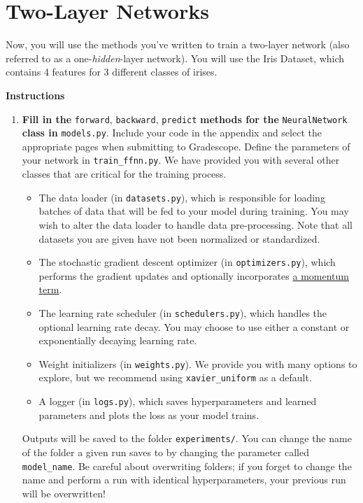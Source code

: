 \documentclass{article}
\newcommand{\Question}[1]{\Large \section{ #1 } \normalsize}
\begin{document}
\newpage
\Question{Two-Layer Networks}
Now, you will use the methods you've written to train a two-layer network (also referred to as a one-\emph{hidden}-layer network). 
You will use the Iris Dataset, which contains 4 features for 3 different classes of irises.

\textbf{Instructions}
\begin{enumerate}
    \item 
    \textbf{Fill in the} \texttt{forward}, \texttt{backward}, \texttt{predict} \textbf{methods for the} \texttt{NeuralNetwork} \textbf{class in} \texttt{models.py}. 
    Include your code in the appendix and select the appropriate pages when submitting to Gradescope. 
    Define the parameters of your network in \texttt{train\_ffnn.py}. 
    We have provided you with several other classes that are critical for the training process.
    \begin{itemize}
        \item 
        The data loader (in \texttt{datasets.py}), which is responsible for loading batches of data that will be fed to your model during training. 
        You may wish to alter the data loader to handle data pre-processing. 
        Note that all datasets you are given have not been normalized or standardized.
        \item 
        The stochastic gradient descent optimizer (in \texttt{optimizers.py}), which performs the gradient updates and optionally incorporates \href{https://machinelearningmastery.com/learning-rate-for-deep-learning-neural-networks/}{a momentum term}.
        \item The learning rate scheduler (in \texttt{schedulers.py}), which handles the optional learning rate decay. 
        You may choose to use either a constant or exponentially decaying learning rate. 
        \item 
        Weight initializers (in \texttt{weights.py}). 
        We provide you with many options to explore, but we recommend using \texttt{xavier\_uniform} as a default.
        \item 
        A logger (in \texttt{logs.py}), which saves hyperparameters and learned parameters and plots the loss as your model trains.
    \end{itemize}
    Outputs will be saved to the folder \texttt{experiments/}. 
    You can change the name of the folder a given run saves to by changing the parameter called \texttt{model\_name}. 
    Be careful about overwriting folders; if you forget to change the name and perform a run with identical hyperparameters, your previous run will be overwritten!


\end{enumerate}
\end{document}
